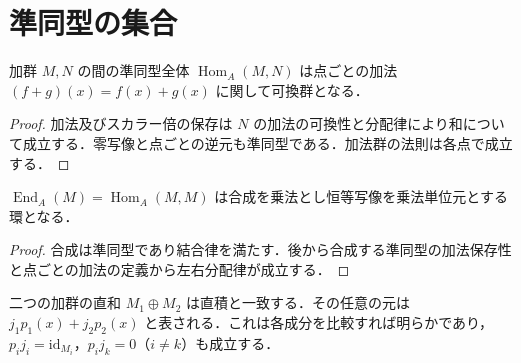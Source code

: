 \section{準同型の集合}
\begin{prop}[加群準同型の加法群]
加群 $M,N$ の間の準同型全体 $\operatorname{Hom}_A(M,N)$ は点ごとの加法 $(f+g)(x)=f(x)+g(x)$ に関して可換群となる．
\end{prop}
\begin{proof}
加法及びスカラー倍の保存は $N$ の加法の可換性と分配律により和について成立する．零写像と点ごとの逆元も準同型である．加法群の法則は各点で成立する．
\end{proof}
\begin{prop}[加群自己準同型環]
$\operatorname{End}_A(M)=\operatorname{Hom}_A(M,M)$ は合成を乗法とし恒等写像を乗法単位元とする環となる．
\end{prop}
\begin{proof}
合成は準同型であり結合律を満たす．後から合成する準同型の加法保存性と点ごとの加法の定義から左右分配律が成立する．
\end{proof}
\begin{prop}[二つの加群の直和]
二つの加群の直和 $M_1\oplus M_2$ は直積と一致する．その任意の元は $j_1p_1(x)+j_2p_2(x)$ と表される．これは各成分を比較すれば明らかであり，$p_i j_i=\mathrm{id}_{M_i}$，$p_i j_k=0$（$i\ne k$）も成立する．
\end{prop}
